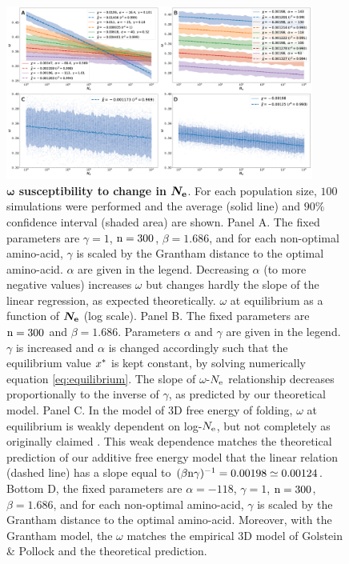 \documentclass{article}
\begin{document}
	\begin{figure}[htb!]
		\begin{mdframed}
			\centering
			\includegraphics[width=0.9\textwidth] {artworks/Elasticity.png}
			\caption{
				\textbf{$\bm{\omega}$ susceptibility to change in $\bm{N_{\mathrm{e}}}$}.
				For each population size, $100$ simulations were performed and the average (solid line) and $90\%$ confidence interval (shaded area) are shown.
				Panel A. The fixed parameters are $\gamma=1$, $\text{n}=300$, $\beta=1.686$, and for each non-optimal amino-acid, $\gamma$ is scaled by the Grantham distance to the optimal amino-acid. $\alpha$ are given in the legend. Decreasing $\alpha$ (to more negative values) increases $\omega$ but changes hardly the slope of the linear regression, as expected theoretically.
				$\omega$ at equilibrium as a function of $\bm{N_{\mathrm{e}}}$ (log scale).
				Panel B. The fixed parameters are $\text{n}=300$ and $\beta=1.686$. Parameters $\alpha$ and $\gamma$ are given in the legend.
				$\gamma$ is increased and $\alpha$ is changed accordingly such that the equilibrium value $x^{*}$ is kept constant, by solving numerically equation \ref{eq:equilibrium}.
				The slope of $\omega$-$N_{\mathrm{e}}$ relationship decreases proportionally to the inverse of $\gamma$, as predicted by our theoretical model.
				Panel C. In the model of 3D free energy of folding, $\omega$ at equilibrium is weakly dependent on log-$N_{\mathrm{e}}$, but not completely as originally claimed \cite{Goldstein2013}.
				This weak dependence matches the theoretical prediction of our additive free energy model that the linear relation (dashed line) has a slope equal to $(\beta \text{n} \gamma)^{-1} = 0.00198 \simeq 0.00124$.
				Bottom D, the fixed parameters are $\alpha=-118$, $\gamma=1$, $\text{n}=300$, $\beta=1.686$, and for each non-optimal amino-acid, $\gamma$ is scaled by the Grantham distance to the optimal amino-acid.
				Moreover, with the Grantham model, the $\omega$ matches the empirical 3D model of Golstein \& Pollock and the theoretical prediction.
				\label{fig:GoldsteinVsToy}
			}
		\end{mdframed}
	\end{figure}
\end{document}
